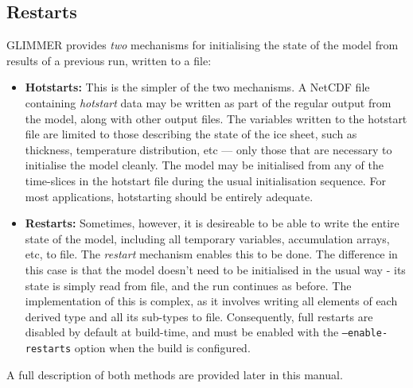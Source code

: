 \subsection{Restarts}\label{ug.sec.restarts}
%
GLIMMER provides {\it two} mechanisms for initialising the state of the model from results of a previous run, written to a file:
%
\begin{itemize}
\item {\bf Hotstarts:} This is the simpler of the two mechanisms. A NetCDF file containing \emph{hotstart} data may be written as part of the regular output from the model, along with other output files. The variables written to the hotstart file are limited to those describing the state of the ice sheet, such as thickness, temperature distribution, etc --- only those that are necessary to initialise the model cleanly. The model may be initialised from any of the time-slices in the hotstart file during the usual initialisation sequence. For most applications, hotstarting should be entirely adequate.
\item {\bf Restarts:} Sometimes, however, it is desireable to be able to write the entire state of the model, including all temporary variables, accumulation arrays, etc, to file. The \emph{restart} mechanism enables this to be done. The difference in this case is that the model doesn't need to be initialised in the usual way - its state is simply read from file, and the run continues as before. The implementation of this is complex, as it involves writing all elements of each derived type and all its sub-types to file. Consequently, full restarts are disabled by default at build-time, and must be enabled with the \texttt{--enable-restarts} option when the build is configured.
\end{itemize}
%
A full description of both methods are provided later in this manual.
